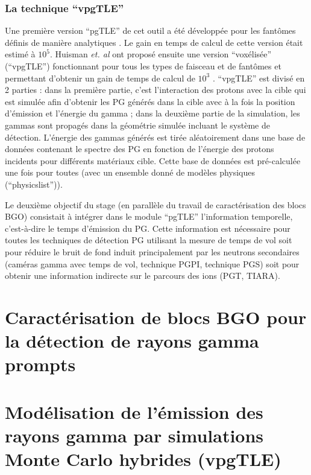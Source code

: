\documentclass[11pt,a4paper,oldfontcommands]{memoir}
\begin{document}
\subsection{La technique \enquote{vpgTLE}}

Une première version \enquote{pgTLE} de cet outil a été développée pour les fantômes définis de manière analytiques \cite{El_Kanawati_2015}. Le gain en temps de calcul de cette version était estimé à $10^5$. Huisman \textit{et. al} ont proposé ensuite une version \enquote{voxélisée} (\enquote{vpgTLE}) fonctionnant pour tous les types de faisceau et de fantômes et permettant d'obtenir un gain de temps de calcul de $10^3$ \cite{Huisman_2016}. \enquote{vpgTLE} est divisé en 2 parties : dans la première partie, c'est l'interaction des protons avec la cible qui est simulée afin d'obtenir les PG générés dans la cible avec à la fois la position d'émission et l'énergie du gamma  ; dans la deuxième partie de la simulation, les gammas sont propagés dans la géométrie simulée incluant le système de détection. L'énergie des gammas générés est tirée aléatoirement dans une base de données contenant le spectre des PG en fonction de l'énergie des protons incidents pour différents matériaux cible. Cette base de données est pré-calculée une fois pour toutes (avec un ensemble donné de modèles physiques (\enquote{physicslist})).

Le deuxième objectif du stage (en parallèle du travail de caractérisation des blocs BGO) consistait à intégrer dans le module \enquote{pgTLE} l'information temporelle, c'est-à-dire le temps d'émission du PG. Cette information est nécessaire pour toutes les techniques de détection PG utilisant la mesure de temps de vol soit pour réduire le bruit de fond induit principalement par les neutrons secondaires (caméras gamma avec temps de vol, technique PGPI, technique PGS) soit pour obtenir une information indirecte sur le parcours des ions (PGT, TIARA).


\openany
\chapter{Caractérisation de blocs BGO pour la détection de rayons gamma prompts}



\chapter{Modélisation de l'émission des rayons gamma par simulations Monte Carlo hybrides (vpgTLE)}
\end{document}
